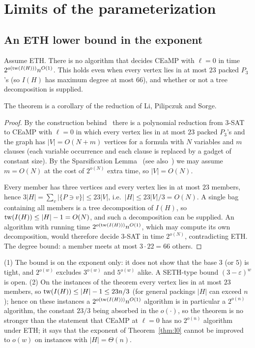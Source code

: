 \section{Limits of the parameterization}\label{sec:limits}
\subsection{An ETH lower bound in the exponent}
\begin{theorem}\label{thm:eth}
Assume ETH. There is no algorithm that decides CEaMP with $\ell=0$ in time $2^{o(\mathrm{tw}(I(H)))}n^{O(1)}$. This holds even when every vertex lies in at most $23$ packed $P_3$'s (so $I(H)$ has maximum degree at most $66$), and whether or not a tree decomposition is supplied.
\end{theorem}
The theorem is a corollary of the reduction of Li, Pilipczuk and Sorge.
\begin{proof}
By the construction behind~\cite[Thm.~1]{LPS23} there is a polynomial reduction from 3-SAT to CEaMP with $\ell=0$ in which every vertex lies in at most $23$ packed $P_3$'s and the graph has $|V|=O(N+m)$ vertices for a formula with $N$ variables and $m$ clauses (each variable occurrence and each clause is replaced by a gadget of constant size). By the Sparsification Lemma~\cite{IPZ01} (see also~\cite{Cygan15}) we may assume $m=O(N)$ at the cost of $2^{o(N)}$ extra time, so $|V|=O(N)$.

Every member has three vertices and every vertex lies in at most $23$ members, hence $3|H|=\sum_v|\{P\ni v\}|\le23|V|$, i.e.\ $|H|\le 23|V|/3=O(N)$. A single bag containing all members is a tree decomposition of $I(H)$, so $\mathrm{tw}(I(H))\le|H|-1=O(N)$, and such a decomposition can be supplied. An algorithm with running time $2^{o(\mathrm{tw}(I(H)))}n^{O(1)}$, which may compute its own decomposition, would therefore decide 3-SAT in time $2^{o(N)}$, contradicting ETH. The degree bound: a member meets at most $3\cdot22=66$ others.
\end{proof}
\begin{remark}
(1) The bound is on the exponent only: it does not show that the base $3$ (or $5$) is tight, and $2^{o(w)}$ excludes $3^{o(w)}$ and $5^{o(w)}$ alike. A SETH-type bound $(3-\varepsilon)^{w}$ is open. (2) On the instances of the theorem every vertex lies in at most $23$ members, so $\mathrm{tw}(I(H))\le|H|-1\le 23n/3$ (for general packings $|H|$ can exceed $n$); hence on these instances a $2^{o(\mathrm{tw}(I(H)))}n^{O(1)}$ algorithm is in particular a $2^{o(n)}$ algorithm, the constant $23/3$ being absorbed in the $o(\cdot)$, so the theorem is no stronger than the statement that CEaMP at $\ell=0$ has no $2^{o(n)}$ algorithm under ETH; it says that the exponent of Theorem~\ref{thm:l0} cannot be improved to $o(w)$ on instances with $|H|=\Theta(n)$.
\end{remark}

